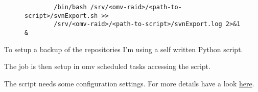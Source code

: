 
\begin{figure}[H]
    \scriptsize
    \centering
    \begin{BVerbatim}
        /bin/bash /srv/<omv-raid>/<path-to-script>/svnExport.sh >>
        /srv/<omv-raid>/<path-to-script>/svnExport.log 2>&1 &
    \end{BVerbatim}
\end{figure}

To setup a backup of the repositories I'm using a self written Python script.
\bigbreak

The job is then setup in \gls{omv} scheduled tasks accessing the script.


 The script needs some configuration settings. For more
details have a look \href{https://github.com/ThirtySomething/SCM-Backup}{here}.
